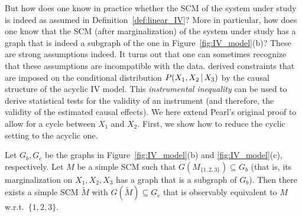 But how does one know in practice whether the SCM of the system under study is indeed as assumed in Definition~\ref{def:linear_IV}?
More in particular, how does one know that the SCM (after marginalization) of the system under study has a graph that is indeed a subgraph of the one in Figure~\ref{fig:IV_model}(b)? 
These are strong assumptions indeed.
It turns out that one can sometimes recognize that these assumptions are incompatible with the data.
\cite{Pearl1995} derived constraints that are imposed on the conditional distribution $P(X_1,X_2 \operatorname*{|} X_3)$ by the causal structure of the acyclic IV model. 
This \emph{instrumental inequality} can be used to derive statistical tests for the validity of an instrument (and therefore, the validity of the estimated causal effects).
We here extend Pearl's original proof to allow for a cycle between $X_1$ and $X_2$.
First, we show how to reduce the cyclic setting to the acyclic one.
\begin{Lem}\label{lem:cyclic_IV_model}
  Let $G_b, G_c$ be the graphs in Figure~\ref{fig:IV_model}(b) and \ref{fig:IV_model}(c), respectively.
  Let $M$ be a simple SCM such that $G(M_{\{1,2,3\}}) \subseteq G_b$ (that is, its marginalization on $X_1, X_2, X_3$ has a graph that is a subgraph of $G_b$). 
  Then there exists a simple SCM $\tilde{M}$ with $G(\tilde{M}) \subseteq G_c$ that is observably equivalent to $M$ w.r.t.\ $\{1,2,3\}$.
\end{Lem}
